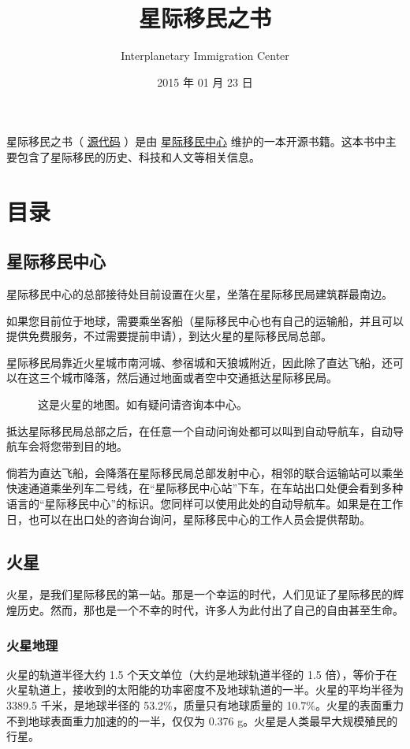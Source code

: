 \documentclass[letterpaper,10pt]{sphinxmanual}
\title{星际移民之书}
\date{2015 年 01 月 23 日}
\author{Interplanetary Immigration Center}
\begin{document}
\maketitle
\tableofcontents
{}\label{index::doc}


星际移民之书（ \href{https://github.com/InterImm/InterImmBook}{源代码} ）是由 \href{http://interimm.org/}{星际移民中心} 维护的一本开源书籍。这本书中主要包含了星际移民的历史、科技和人文等相关信息。


\chapter{目录}
\label{index:id4}\label{index:id1}

\section{星际移民中心}
\label{InterImm::doc}\label{InterImm:id1}
星际移民中心的总部接待处目前设置在火星，坐落在星际移民局建筑群最南边。

如果您目前位于地球，需要乘坐客船（星际移民中心也有自己的运输船，并且可以提供免费服务，不过需要提前申请），到达火星的星际移民局总部。

星际移民局靠近火星城市南河城、参宿城和天狼城附近，因此除了直达飞船，还可以在这三个城市降落，然后通过地面或者空中交通抵达星际移民局。
\begin{figure}[htbp]
\centering
\capstart
\caption{这是火星的地图。如有疑问请咨询本中心。}\end{figure}

抵达星际移民局总部之后，在任意一个自动问询处都可以叫到自动导航车，自动导航车会将您带到目的地。

倘若为直达飞船，会降落在星际移民局总部发射中心，相邻的联合运输站可以乘坐快速通道乘坐列车二号线，在“星际移民中心站”下车，在车站出口处便会看到多种语言的“星际移民中心”的标识。您同样可以使用此处的自动导航车。如果是在工作日，也可以在出口处的咨询台询问，星际移民中心的工作人员会提供帮助。


\section{火星}
\label{mars::doc}\label{mars:id1}
火星，是我们星际移民的第一站。那是一个幸运的时代，人们见证了星际移民的辉煌历史。然而，那也是一个不幸的时代，许多人为此付出了自己的自由甚至生命。


\subsection{火星地理}
\label{mars:id2}
火星的轨道半径大约 1.5 个天文单位（大约是地球轨道半径的 1.5 倍），等价于在火星轨道上，接收到的太阳能的功率密度不及地球轨道的一半。火星的平均半径为 3389.5 千米，是地球半径的 53.2\%，质量只有地球质量的 10.7\%。火星的表面重力不到地球表面重力加速的的一半，仅仅为 0.376 g。火星是人类最早大规模殖民的行星。
\begin{figure}[htbp]
\centering
\end{figure}
\end{document}
